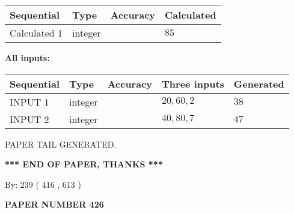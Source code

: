 \documentclass[12pt]{article}
\begin{document}
   
   
   
\noindent{}
   
   
  
  
\noindent\begin{tabular}{|l|l|l|l|}
\hline
 Sequential & Type & Accuracy & Calculated \\ 
\hline
 
 
  Calculated $  1 $ & integer &  & 
  $ 85 $ 
 \\  \hline  
 \end{tabular}
   
   
   
   
\noindent\vspace{0.1in}\hspace{-0.08in} {\textbf{\Large{All inputs: }}}
   
   
  
  
\noindent\begin{tabular}{|l|l|l|l|l|}
\hline
 Sequential & Type & Accuracy & Three inputs & Generated \\ 
\hline
 
 
  INPUT $  1 $ & integer &  & $
 20
 , 
 60
 , 
 2
 $ & $ 38 $ 
 \\  \hline  
 
 
  INPUT $  2 $ & integer &  & $
 40
 , 
 80
 , 
 7
 $ & $ 47 $ 
 \\  \hline  
 \end{tabular}
   
   
   
   
   
   
 \vspace{0.2in}
 
   
   
\vspace{2.0in} PAPER TAIL GENERATED.
   
   
   
   
\vspace{1.0in} 
{\textbf{\large{ *** END OF PAPER, THANKS *** }}} 
   
   
\hspace{1.0in} By: 
 239 ( 416 ,  613 )
   
   
   
   
\newpage 
\setcounter{page}{ 
   426001 } 
   
   
   
   
 {\textbf{ \Large{ PAPER NUMBER  426  }}}
   
\end{document}
